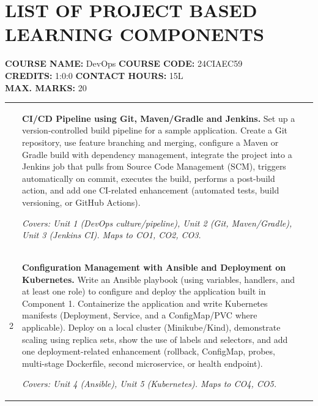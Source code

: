 \documentclass[12pt,a4paper]{article}
\newcommand{\sizeTwelve}{\fontsize{12pt}{15pt}\selectfont}
\begin{document}
\section*{LIST OF PROJECT BASED LEARNING COMPONENTS}

\noindent
{\sizeTwelve
\textbf{COURSE NAME:} DevOps \hfill \textbf{COURSE CODE:} 24CIAEC59 \\
\textbf{CREDITS:} 1:0:0 \hfill \textbf{CONTACT HOURS:} 15L \\
\textbf{MAX. MARKS:} 20
\par}

\vspace{0.6cm}

{\sizeTwelve
\setlength{\tabcolsep}{4pt}
\renewcommand{\arraystretch}{1.25}
\begin{longtable}{|>{\centering\arraybackslash}m{1.2cm}|>{\raggedright\arraybackslash}p{10.6cm}|>{\centering\arraybackslash}m{1.8cm}|}
\hline
\multicolumn{1}{|c|}{\textbf{Sl. No}} &
\multicolumn{1}{c|}{\textbf{Description}} &
\multicolumn{1}{c|}{\textbf{Marks}} \\
\hline
\endhead

1 &
\textbf{CI/CD Pipeline using Git, Maven/Gradle and Jenkins.}
Set up a version-controlled build pipeline for a sample application. Create a Git repository, use feature branching and merging, configure a Maven or Gradle build with dependency management, integrate the project into a Jenkins job that pulls from Source Code Management (SCM), triggers automatically on commit, executes the build, performs a post-build action, and add one CI-related enhancement (automated tests, build versioning, or GitHub Actions).

\textit{Covers: Unit 1 (DevOps culture/pipeline), Unit 2 (Git, Maven/Gradle), Unit 3 (Jenkins CI). Maps to CO1, CO2, CO3.}
& 10 \\
\hline

2 &
\textbf{Configuration Management with Ansible and Deployment on Kubernetes.}
Write an Ansible playbook (using variables, handlers, and at least one role) to configure and deploy the application built in Component 1. Containerize the application and write Kubernetes manifests (Deployment, Service, and a ConfigMap/PVC where applicable). Deploy on a local cluster (Minikube/Kind), demonstrate scaling using replica sets, show the use of labels and selectors, and add one deployment-related enhancement (rollback, ConfigMap, probes, multi-stage Dockerfile, second microservice, or health endpoint).

\textit{Covers: Unit 4 (Ansible), Unit 5 (Kubernetes). Maps to CO4, CO5.}
& 10 \\
\hline

\end{longtable}
\par}
\end{document}
